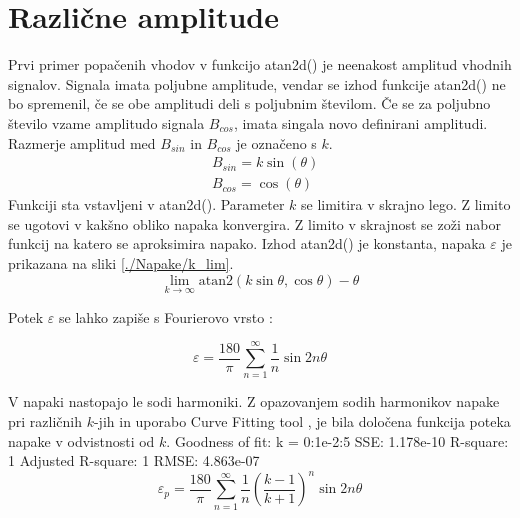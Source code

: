 \section{Različne amplitude}
Prvi primer popačenih vhodov v funkcijo atan2d() je neenakost amplitud vhodnih signalov. Signala imata poljubne amplitude, vendar se izhod funkcije atan2d() ne bo spremenil, če se obe amplitudi deli s
poljubnim številom. Če se za poljubno število vzame amplitudo signala $B_{cos}$, imata singala novo definirani amplitudi. Razmerje amplitud med $B_{sin}$ in $B_{cos}$ je označeno s $k$.
\begin{eqnarray}
\label{equ:def_sin_ama}
&B_{sin} = k \sin(\theta)\\
\label{equ:def_cos_amp}
&B_{cos} =\cos(\theta)
\end{eqnarray}
Funkciji sta vstavljeni v atan2d(). Parameter $k$ se limitira v skrajno lego. Z limito se ugotovi v kakšno obliko napaka konvergira. Z limito v skrajnost se zoži nabor funkcij na katero se aproksimira napako.  Izhod atan2d() je konstanta, napaka $\varepsilon$ je prikazana na sliki \ref{./Napake/k_lim}.
\begin{equation}
\lim_{k \rightarrow \infty} \mathrm{atan2}(k \sin{\theta},\cos{\theta}) - \theta
\end{equation}

Potek $\varepsilon$ se lahko zapiše s Fourierovo vrsto \cite{Matematika1}:

\begin{equation}
\varepsilon = \frac{180}{\pi}\sum_{n=1}^{\infty}\frac{1}{n} \sin 2 n \theta
\end{equation}

V napaki nastopajo le sodi harmoniki. Z opazovanjem sodih harmonikov napake pri različnih $k$-jih in uporabo Curve Fitting tool \cite{cftool}, je bila določena funkcija poteka napake v odvistnosti od $k$. 
Goodness of fit:
k = 0:1e-2:5
SSE: 1.178e-10
R-square: 1
Adjusted R-square: 1
RMSE: 4.863e-07
\begin{equation}
\label{vrsta_k}
\varepsilon_p =\frac{180}{\pi}\sum_{n=1}^{\infty}\frac{1}{n}(\frac{k-1}{k+1})^n \sin 2 n \theta
\end{equation}


